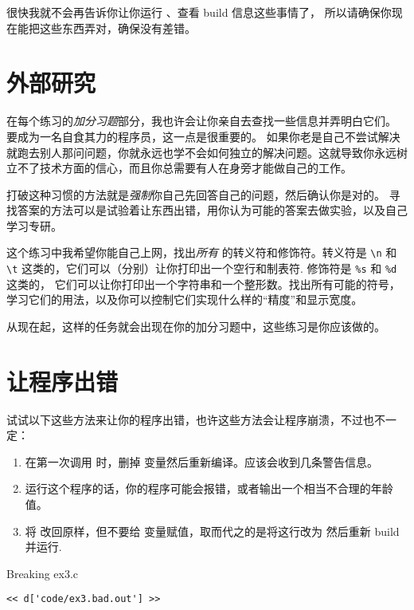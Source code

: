 很快我就不会再告诉你让你运行  、查看 build 信息这些事情了， 所以请确保你现在能把这些东西弄对，确保没有差错。

\section{外部研究}

在每个练习的\emph{加分习题}部分，我也许会让你亲自去查找一些信息并弄明白它们。 要成为一名自食其力的程序员，这一点是很重要的。 如果你老是自己不尝试解决就跑去别人那问问题，你就永远也学不会如何独立的解决问题。这就导致你永远树立不了技术方面的信心，而且你总需要有人在身旁才能做自己的工作。

打破这种习惯的方法就是\emph{强制}你自己先回答自己的问题，然后确认你是对的。 寻找答案的方法可以是试验着让东西出错，用你认为可能的答案去做实验，以及自己学习专研。

这个练习中我希望你能自己上网，找出\emph{所有}  的转义符和修饰符。转义符是
\verb|\n| 和 \verb|\t| 这类的，它们可以（分别）让你打印出一个空行和制表符. 修饰符是 \verb|%s| 和 \verb|%d| 这类的， 它们可以让你打印出一个字符串和一个整形数。找出所有可能的符号， 学习它们的用法，以及你可以控制它们实现什么样的“精度”和显示宽度。

从现在起，这样的任务就会出现在你的加分习题中，这些练习是你应该做的。

\section{让程序出错}

试试以下这些方法来让你的程序出错，也许这些方法会让程序崩溃，不过也不一定：

\begin{enumerate}
\item 在第一次调用  时，删掉  变量然后重新编译。应该会收到几条警告信息。
\item 运行这个程序的话，你的程序可能会报错，或者输出一个相当不合理的年龄值。
\item 将  改回原样，但不要给  变量赋值，取而代之的是将这行改为  然后重新 build 并运行.
\end{enumerate}


\begin{Terminal}{Breaking ex3.c}
\begin{lstlisting}
<< d['code/ex3.bad.out'] >>
\end{lstlisting}
\end{Terminal}

